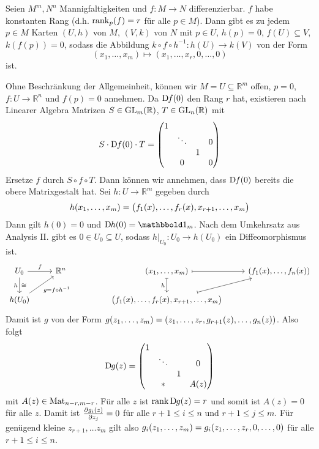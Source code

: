 \begin{satz}[{name={Rangsatz}},label=satz:rangsatz]
	Seien $M^m,N^n$ Mannigfaltigkeiten und $f \colon M \to N$ differenzierbar.
	$f$ habe konstanten Rang (d.h. $\rank_p(f) = r$ für alle $p \in M$).
	Dann gibt es zu jedem $p \in M$ Karten $(U,h)$ von $M$, $(V,k)$ von $N$ mit $p \in U$, $h(p)=0$, $f(U) \subseteq V$, $k(f(p))=0$, sodass die Abbildung $k \circ f \circ h^{-1} \colon h(U) \to k(V)$ von der Form 
	\[
		(x_1, \ldots ,x_m) \longmapsto (x_1,\ldots ,x_r,0, \ldots ,0) 
	\]
	ist.
\end{satz}
\begin{beweis}
	Ohne Beschränkung der Allgemeinheit, können wir $M=U \subseteq \mathbb{R}^m$ offen, $p=0$, $f \colon U \to \mathbb{R}^n$ und $f(p)=0$ annehmen.
	Da $\D f(0)$ den Rang $r$ hat, existieren nach Linearer Algebra Matrizen $S \in \GL_m(\mathbb{R})$, $T \in \GL_n(\mathbb{R})$ mit
	\[
		S \cdot \D f(0) \cdot T = \begin{pmatrix}
			1 & & &  \\
			& \ddots & & 0 \\
			& & 1 &  \\
			 & 0 & & 0
		\end{pmatrix}
	\]
	Ersetze $f$ durch $S \circ f \circ T$.
	Dann können wir annehmen, dass $\D f(0)$ bereits die obere Matrixgestalt hat.
	Sei $h \colon U \to \mathbb{R}^m$ gegeben durch 
	\[
		h(x_1, \ldots ,x_m) = \enbrace[\big]{f_1(x), \ldots , f_r(x), x_{r+1}, \ldots , x_m}
	\]
	Dann gilt $h(0)=0$ und $\D h(0) = \ind_m$.
	Nach dem Umkehrsatz aus Analysis II. gibt es $0 \in U_0 \subseteq U$, sodass $h|_{U_0} \colon U_0 \to h(U_0)$ ein Diffeomorphismus ist.
	\[
		\begin{tikzcd}
			U_0 \rar["f"] \dar["h"',"\cong"] & \mathbb{R}^n & & (x_1, \ldots ,x_m) \rar[mapsto] \dar[mapsto,"h"'] & \enbrace*{f_1(x), \ldots , f_n(x)} \\
			h(U_0) \urar["g=f \circ h^{-1}"'] & & &  \enbrace[\big]{f_1(x), \ldots , f_r(x), x_{r+1}, \ldots ,x_m} \urar[mapsto]
		\end{tikzcd}
	\]
	Damit ist $g$ von der Form $g(z_1, \ldots ,z_m) = \enbrace*{z_1, \ldots ,z_r, g_{r+1}(z), \ldots , g_n(z)}$.
	Also folgt
	\[
		\D g(z) = \begin{pmatrix}
			1 & & &  \\
			& \ddots & & 0 \\
			& & 1 &  \\
			 & * & & A(z)
		\end{pmatrix}
	\]
	mit $A(z) \in \Mat_{n-r,m-r}$.
	Für alle $z$ ist $\rank \D g(z) = r$ und somit ist $A(z) = 0$ für alle $z$.
	Damit ist $\diff{g_i(z)}{z_j} = 0$ für alle $r +1 \le i \le n$ und $r+1 \le j \le m$.
	Für genügend kleine $z_{r+1}, \ldots z_m$ gilt also $g_i(z_1, \ldots ,z_m) = g_i \enbrace*{z_1, \ldots , z_r,0, \ldots ,0}$ für alle $r +1 \le i \le n$.
	

\end{beweis}
